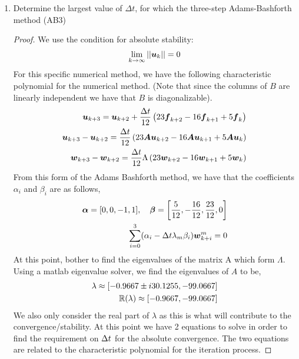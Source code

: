 \documentclass{article}
\begin{document}
\begin{enumerate}[label=\alph*)]

  \item Determine the largest value of $\Delta t$, for which the three-step 
        Adams-Bashforth method (AB3)
    \begin{proof}
      We use the condition for absolute stability: 
      \begin{align}
        \lim_{k \to \infty} ||\boldsymbol{u}_k|| = 0
      \end{align}
      For this specific numerical method, we have the following characteristic
      polynomial for the numerical method. (Note that since the columns of $B$
      are linearly independent we have that $B$ is diagonalizable).
      \begin{align}
        \boldsymbol{u}_{k+3} = \boldsymbol{u}_{k+2} + \frac{\Delta t}{12}\left(23\boldsymbol{f}_{k+2} -
        16\boldsymbol{f}_{k+1} + 5\boldsymbol{f}_k\right)\\
        \boldsymbol{u}_{k+3} - \boldsymbol{u}_{k+2} = \frac{\Delta t}{12}\left( 23\boldsymbol{Au}_{k+2} -
        16\boldsymbol{Au}_{k+1} + 5\boldsymbol{Au}_k\right)\\
        \boldsymbol{w}_{k+3} - \boldsymbol{w}_{k+2} = \frac{\Delta t}{12}\Lambda\left( 23\boldsymbol{w}_{k+2} -
        16\boldsymbol{w}_{k+1} + 5\boldsymbol{w}_k\right)
      \end{align}
      From this form of the Adams Bashforth method, we have that the
      coefficients $\alpha_i$ and $\beta_i$ are as follows, 
      \begin{align}
        \boldsymbol{\alpha} = [0, 0, -1, 1], \quad \boldsymbol{\beta} = \left[ \frac{5}{12},
        -\frac{16}{12}, \frac{23}{12}, 0\right]  \\
        \sum_{i=0}^3 (\alpha_i - \Delta t\lambda_m\beta_i)\boldsymbol{w}_{k+i}^m = 0
      \end{align}
      At this point, bother to find the eigenvalues of the matrix A which form
      $\Lambda$. Using a matlab eigenvalue solver, we find the eigenvalues of
      $A$ to be, 
      \begin{align*}
            \lambda \approx \left[ -0.9667 \pm i 30.1255, -99.0667\right]\\
            \mathbb{R}(\lambda) \approx \left[ -0.9667, -99.0667\right]
      \end{align*}
      We also only consider the real part of $\lambda$ as this is what will
      contribute to the convergence/stability. At this point we have 2 equations
      to solve in order to find the requirement on $\Delta t$ for the absolute
      convergence. The two equations are related to the characteristic
      polynomial for the iteration process. 

\end{proof}
\end{enumerate}
\end{document}
